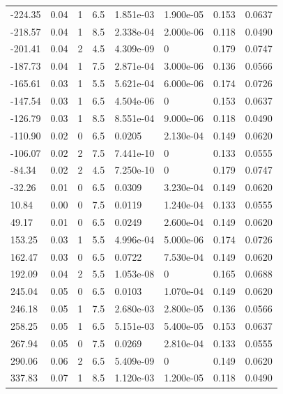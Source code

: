 \documentclass[preview]{standalone}
\begin{document}
{{\begin{tabular}{L{1.2cm}C{1.2cm} C{0.3cm}C{0.5cm} C{1.4cm}C{1.4cm} C{1.4cm}C{1.4cm}}
  -224.35  &  0.04  & 1     & 6.5 &  1.851e-03  & 1.900e-05  & 0.153 &  0.0637   \\ 
  -218.57  &  0.04  & 1     & 8.5 &  2.338e-04  & 2.000e-06  & 0.118 &  0.0490   \\ 
  -201.41  &  0.04  & 2     & 4.5 &  4.309e-09  & 0  & 0.179 &  0.0747   \\ 
  -187.73  &  0.04  & 1     & 7.5 &  2.871e-04  & 3.000e-06  & 0.136 &  0.0566   \\ 
  -165.61  &  0.03  & 1     & 5.5 &  5.621e-04  & 6.000e-06  & 0.174 &  0.0726   \\ 
  -147.54  &  0.03  & 1     & 6.5 &  4.504e-06  & 0  & 0.153 &  0.0637   \\ 
  -126.79  &  0.03  & 1     & 8.5 &  8.551e-04  & 9.000e-06  & 0.118 &  0.0490   \\ 
  -110.90  &  0.02  & 0     & 6.5 &  0.0205  & 2.130e-04  & 0.149 &  0.0620   \\ 
  -106.07  &  0.02  & 2     & 7.5 &  7.441e-10  & 0  & 0.133 &  0.0555   \\ 
  -84.34  &  0.02  & 2     & 4.5 &  7.250e-10  & 0  & 0.179 &  0.0747   \\ 
  -32.26  &  0.01  & 0     & 6.5 &  0.0309  & 3.230e-04  & 0.149 &  0.0620   \\ 
  10.84  &  0.00  & 0     & 7.5 &  0.0119  & 1.240e-04  & 0.133 &  0.0555   \\ 
  49.17  &  0.01  & 0     & 6.5 &  0.0249  & 2.600e-04  & 0.149 &  0.0620   \\ 
  153.25  &  0.03  & 1     & 5.5 &  4.996e-04  & 5.000e-06  & 0.174 &  0.0726   \\ 
  162.47  &  0.03  & 0     & 6.5 &  0.0722  & 7.530e-04  & 0.149 &  0.0620   \\ 
  192.09  &  0.04  & 2     & 5.5 &  1.053e-08  & 0  & 0.165 &  0.0688   \\ 
  245.04  &  0.05  & 0     & 6.5 &  0.0103  & 1.070e-04  & 0.149 &  0.0620   \\ 
  246.18  &  0.05  & 1     & 7.5 &  2.680e-03  & 2.800e-05  & 0.136 &  0.0566   \\ 
  258.25  &  0.05  & 1     & 6.5 &  5.151e-03  & 5.400e-05  & 0.153 &  0.0637   \\ 
  267.94  &  0.05  & 0     & 7.5 &  0.0269  & 2.810e-04  & 0.133 &  0.0555   \\ 
  290.06  &  0.06  & 2     & 6.5 &  5.409e-09  & 0  & 0.149 &  0.0620   \\ 
  337.83  &  0.07  & 1     & 8.5 &  1.120e-03  & 1.200e-05  & 0.118 &  0.0490   \\ 

\end{tabular}}}
\end{document}
